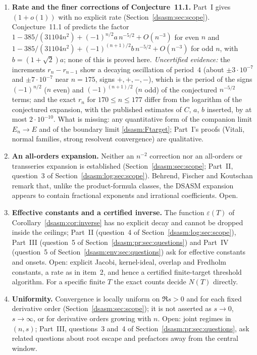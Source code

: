 \documentclass[11pt,letterpaper]{article}
\theoremstyle{remark}\newtheorem{remark}[theorem]{Remark}
\newcommand{\eps}{\varepsilon}\newcommand{\HH}{\mathcal H}\newcommand{\one}{\mathbf1}
\begin{document}
\begin{enumerate}
\item \textbf{Rate and the finer corrections of Conjecture~11.1.} Part~I gives $(1+o(1))$ with no explicit rate (Section~\ref{dsasm:sec:scope}). Conjecture~11.1 of \cite{bfk} predicts the factor $1-385/(31104n^2)+(-1)^{n/2}a\,n^{-5/2}+O(n^{-3})$ for even $n$ and $1-385/(31104n^2)+(-1)^{(n+1)/2}b\,n^{-5/2}+O(n^{-3})$ for odd $n$, with $b=(1+\sqrt2)a$; none of this is proved here. \emph{Uncertified evidence:} the increments $r_n-r_{n-1}$ show a decaying oscillation of period~$4$ (about $\pm3\cdot10^{-7}$ and $\pm7\cdot10^{-7}$ near $n=175$, signs $+,+,-,-$), which is the period of the signs $(-1)^{n/2}$ ($n$ even) and $(-1)^{(n+1)/2}$ ($n$ odd) of the conjectured $n^{-5/2}$ terms; and the exact $r_n$ for $170\le n\le177$ differ from the logarithm of the conjectured expansion, with the published estimates of $C$, $a$, $b$ inserted, by at most $2\cdot10^{-10}$. What is missing: any quantitative form of the companion limit $E_n\to E$ and of the boundary limit \eqref{dsasm:Ftarget}; Part~I's proofs (Vitali, normal families, strong resolvent convergence) are qualitative.
\item \textbf{An all-orders expansion.} Neither an $n^{-2}$ correction nor an all-orders or transseries expansion is established (Section~\ref{dsasm:sec:scope}; Part~II, question~3 of Section~\ref{dsasm:log:sec:scope}). Behrend, Fischer and Koutschan remark that, unlike the product-formula classes, the DSASM expansion appears to contain fractional exponents and irrational coefficients. Open.
\item \textbf{Effective constants and a certified inverse.} The function $\eps(T)$ of Corollary~\ref{dsasm:cor:inverse} has no explicit decay and cannot be dropped inside the ceilings; Part~II (question~4 of Section~\ref{dsasm:log:sec:scope}), Part~III (question~5 of Section~\ref{dsasm:pr:sec:questions}) and Part~IV (question~5 of Section~\ref{dsasm:env:sec:questions}) ask for effective constants and onsets. Open: explicit Jacobi, kernel-ideal, overlap and Fredholm constants, a rate as in item~2, and hence a certified finite-target threshold algorithm. For a specific finite $T$ the exact counts decide $N(T)$ directly.
\item \textbf{Uniformity.} Convergence is locally uniform on $\Re s>0$ and for each fixed derivative order (Section~\ref{dsasm:sec:scope}); it is not asserted as $s\to0$, $s\to\infty$, or for derivative orders growing with $n$. Open: joint regimes in $(n,s)$; Part~III, questions~3 and~4 of Section~\ref{dsasm:pr:sec:questions}, ask related questions about root escape and prefactors away from the central window.

\end{enumerate}
\end{document}
